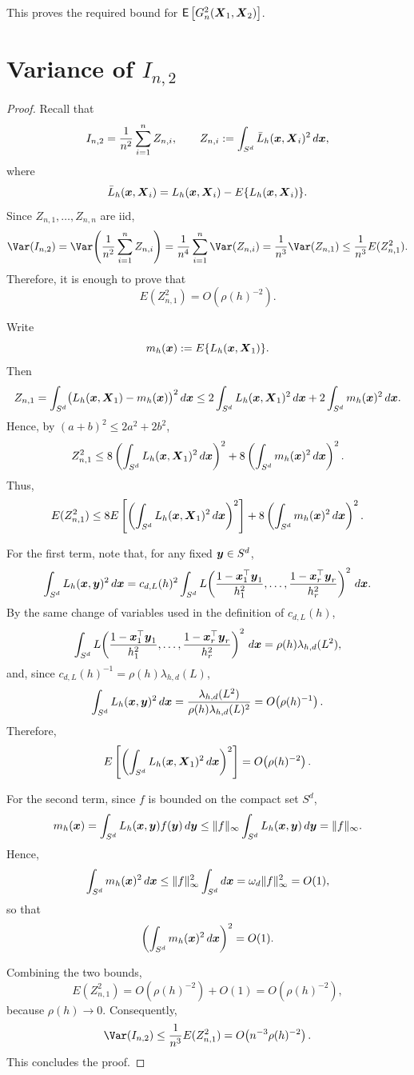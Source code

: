 \documentclass{article}
\begin{document}
This proves the required bound for \(\mathsf{E}\left[G_n^2(\boldsymbol{X}_1,\boldsymbol{X}_2)\right]\).

\section{Variance of $I_{n,2}$}

\begin{proof}
Recall that
\[
I_{n,2}
=
\frac{1}{n^2}\sum_{i=1}^n Z_{n,i},
\qquad
Z_{n,i}
:=
\int_{S^d} \bar{L}_h(\boldsymbol{x},\boldsymbol{X}_i)^2 \, d\boldsymbol{x},
\]
where
\[
\bar{L}_h(\boldsymbol{x},\boldsymbol{X}_i)
=
L_h(\boldsymbol{x},\boldsymbol{X}_i)-E\{L_h(\boldsymbol{x},\boldsymbol{X}_i)\}.
\]
Since \(Z_{n,1},\ldots,Z_{n,n}\) are iid,
\[
\Var(I_{n,2})
=
\Var\!\left(\frac{1}{n^2}\sum_{i=1}^n Z_{n,i}\right)
=
\frac{1}{n^4}\sum_{i=1}^n \Var(Z_{n,i})
=
\frac{1}{n^3}\Var(Z_{n,1})
\leq
\frac{1}{n^3}E(Z_{n,1}^2).
\]
Therefore, it is enough to prove that
\[
E(Z_{n,1}^2)=O\!\left(\rho(h)^{-2}\right).
\]

Write
\[
m_h(\boldsymbol{x}):=E\{L_h(\boldsymbol{x},\boldsymbol{X}_1)\}.
\]
Then
\[
Z_{n,1}
=
\int_{S^d}\bigl(L_h(\boldsymbol{x},\boldsymbol{X}_1)-m_h(\boldsymbol{x})\bigr)^2\,d\boldsymbol{x}
\leq
2\int_{S^d}L_h(\boldsymbol{x},\boldsymbol{X}_1)^2\,d\boldsymbol{x}
+
2\int_{S^d}m_h(\boldsymbol{x})^2\,d\boldsymbol{x}.
\]
Hence, by \((a+b)^2\leq 2a^2+2b^2\),
\[
Z_{n,1}^2
\leq
8\left(\int_{S^d}L_h(\boldsymbol{x},\boldsymbol{X}_1)^2\,d\boldsymbol{x}\right)^2
+
8\left(\int_{S^d}m_h(\boldsymbol{x})^2\,d\boldsymbol{x}\right)^2.
\]
Thus,
\[
E(Z_{n,1}^2)
\leq
8E\left[\left(\int_{S^d}L_h(\boldsymbol{x},\boldsymbol{X}_1)^2\,d\boldsymbol{x}\right)^2\right]
+
8\left(\int_{S^d}m_h(\boldsymbol{x})^2\,d\boldsymbol{x}\right)^2.
\]

For the first term, note that, for any fixed \(\boldsymbol{y}\in S^d\),
\[
\int_{S^d}L_h(\boldsymbol{x},\boldsymbol{y})^2\,d\boldsymbol{x}
=
c_{d,L}(h)^2
\int_{S^d}
L\!\left(
\frac{1-\boldsymbol{x}_1^\top\boldsymbol{y}_1}{h_1^2},
\ldots,
\frac{1-\boldsymbol{x}_r^\top\boldsymbol{y}_r}{h_r^2}
\right)^2
\,d\boldsymbol{x}.
\]
By the same change of variables used in the definition of \(c_{d,L}(h)\),
\[
\int_{S^d}
L\!\left(
\frac{1-\boldsymbol{x}_1^\top\boldsymbol{y}_1}{h_1^2},
\ldots,
\frac{1-\boldsymbol{x}_r^\top\boldsymbol{y}_r}{h_r^2}
\right)^2
\,d\boldsymbol{x}
=
\rho(h)\lambda_{h,d}(L^2),
\]
and, since \(c_{d,L}(h)^{-1}=\rho(h)\lambda_{h,d}(L)\),
\[
\int_{S^d}L_h(\boldsymbol{x},\boldsymbol{y})^2\,d\boldsymbol{x}
=
\frac{\lambda_{h,d}(L^2)}{\rho(h)\lambda_{h,d}(L)^2}
=
O\!\left(\rho(h)^{-1}\right).
\]
Therefore,
\[
E\left[\left(\int_{S^d}L_h(\boldsymbol{x},\boldsymbol{X}_1)^2\,d\boldsymbol{x}\right)^2\right]
=
O\!\left(\rho(h)^{-2}\right).
\]

For the second term, since \(f\) is bounded on the compact set \(S^d\),
\[
m_h(\boldsymbol{x})
=
\int_{S^d}L_h(\boldsymbol{x},\boldsymbol{y})f(\boldsymbol{y})\,d\boldsymbol{y}
\leq
\|f\|_\infty \int_{S^d}L_h(\boldsymbol{x},\boldsymbol{y})\,d\boldsymbol{y}
=
\|f\|_\infty.
\]
Hence,
\[
\int_{S^d}m_h(\boldsymbol{x})^2\,d\boldsymbol{x}
\leq
\|f\|_\infty^2 \int_{S^d}d\boldsymbol{x}
=
\omega_d\|f\|_\infty^2
=
O(1),
\]
so that
\[
\left(\int_{S^d}m_h(\boldsymbol{x})^2\,d\boldsymbol{x}\right)^2
=
O(1).
\]

Combining the two bounds,
\[
E(Z_{n,1}^2)
=
O\!\left(\rho(h)^{-2}\right)+O(1)
=
O\!\left(\rho(h)^{-2}\right),
\]
because \(\rho(h)\to 0\). Consequently,
\[
\Var(I_{n,2})
\leq
\frac{1}{n^3}E(Z_{n,1}^2)
=
O\!\left(n^{-3}\rho(h)^{-2}\right).
\]
This concludes the proof.
\end{proof}
\end{document}
